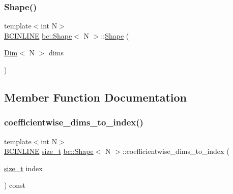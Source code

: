 \subsubsection{\texorpdfstring{Shape()}{Shape()}\hspace{0.1cm}{\footnotesize\ttfamily [6/6]}}
{\footnotesize\ttfamily template$<$int N$>$ \\
\hyperlink{common_8h_a6699e8b0449da5c0fafb878e59c1d4b1}{B\+C\+I\+N\+L\+I\+NE} \hyperlink{structbc_1_1Shape}{bc\+::\+Shape}$<$ N $>$\+::\hyperlink{structbc_1_1Shape}{Shape} (\begin{DoxyParamCaption}\item[{\hyperlink{structbc_1_1Dim}{Dim}$<$ N $>$}]{dims }\end{DoxyParamCaption})\hspace{0.3cm}{\ttfamily [inline]}}



\subsection{Member Function Documentation}
\mbox{\label{structbc_1_1Shape_a6fad543e17ae86758fa40ecb0aa3cbf7}} 
\subsubsection{\texorpdfstring{coefficientwise\+\_\+dims\+\_\+to\+\_\+index()}{coefficientwise\_dims\_to\_index()}}
{\footnotesize\ttfamily template$<$int N$>$ \\
\hyperlink{common_8h_a6699e8b0449da5c0fafb878e59c1d4b1}{B\+C\+I\+N\+L\+I\+NE} \hyperlink{structbc_1_1Shape_a63f974ebdb0e3755ef3140b17abcf235}{size\+\_\+t} \hyperlink{structbc_1_1Shape}{bc\+::\+Shape}$<$ N $>$\+::coefficientwise\+\_\+dims\+\_\+to\+\_\+index (\begin{DoxyParamCaption}\item[{\hyperlink{structbc_1_1Shape_a63f974ebdb0e3755ef3140b17abcf235}{size\+\_\+t}}]{index }\end{DoxyParamCaption}) const\hspace{0.3cm}{\ttfamily [inline]}}

\mbox{\label{structbc_1_1Shape_aa92f7525e2f0860ad271ebbae1cf29fb}} 
